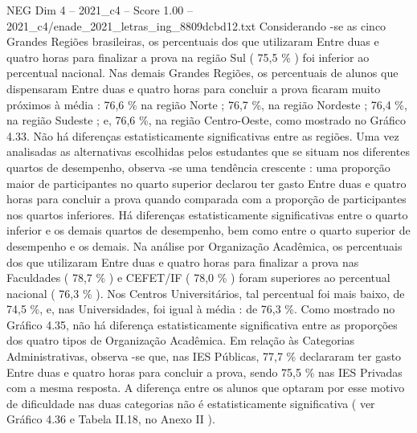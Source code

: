 \begin{textsample}{NEG Dim 4 – 2021\_c4 – Score 1.00 – 2021\_c4/enade\_2021\_letras\_ing\_8809dcbd12.txt}
Considerando -se as cinco Grandes Regiões brasileiras, os percentuais dos que utilizaram Entre duas e quatro horas para finalizar a prova na região Sul ( 75,5 \% ) foi inferior ao percentual nacional.
Nas demais Grandes Regiões, os percentuais de alunos que dispensaram Entre duas e quatro horas para concluir a prova ficaram muito próximos à média : 76,6 \% na região Norte ; 76,7 \%, na região Nordeste ; 76,4 \%, na região Sudeste ; e, 76,6 \%, na região Centro-Oeste, como mostrado no Gráfico 4.33.
Não há diferenças estatisticamente significativas entre as regiões.
Uma vez analisadas as alternativas escolhidas pelos estudantes que se situam nos diferentes quartos de desempenho, observa -se uma tendência crescente : uma proporção maior de participantes no quarto superior declarou ter gasto Entre duas e quatro horas para concluir a prova quando comparada com a proporção de participantes nos quartos inferiores.
Há diferenças estatisticamente significativas entre o quarto inferior e os demais quartos de desempenho, bem como entre o quarto superior de desempenho e os demais.
Na análise por Organização Acadêmica, os percentuais dos que utilizaram Entre duas e quatro horas para finalizar a prova nas Faculdades ( 78,7 \% ) e CEFET/IF ( 78,0 \% ) foram superiores ao percentual nacional ( 76,3 \% ).
Nos Centros Universitários, tal percentual foi mais baixo, de 74,5 \%, e, nas Universidades, foi igual à média : de 76,3 \%.
Como mostrado no Gráfico 4.35, não há diferença estatisticamente significativa entre as proporções dos quatro tipos de Organização Acadêmica.
Em relação às Categorias Administrativas, observa -se que, nas IES Públicas, 77,7 \% declararam ter gasto Entre duas e quatro horas para concluir a prova, sendo 75,5 \% nas IES Privadas com a mesma resposta.
A diferença entre os alunos que optaram por esse motivo de dificuldade nas duas categorias não é estatisticamente significativa ( ver Gráfico 4.36 e Tabela II.18, no Anexo II ).

\end{textsample}
